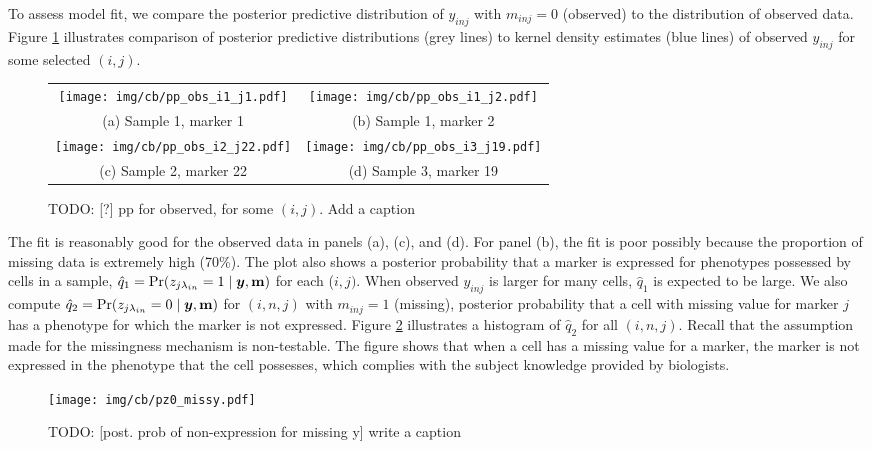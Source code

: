 \documentclass[12pt,]{article}
\def\Prob{\text{Pr}}
\newcommand{\by}{\mbox{\boldmath $y$}}
\begin{document}
To assess model fit, we compare the posterior predictive distribution of
$y_{inj}$ with $m_{inj}=0$ (observed) to the distribution of observed data.
Figure \ref{fig:cb-pp-obs-some} illustrates comparison of posterior predictive
distributions (grey lines) to kernel density estimates (blue lines) of observed
$y_{inj}$ for some selected $(i,j)$.
\begin{figure}%
\begin{center}
  \begin{tabular}{cc}
  \texttt{[image: img/cb/pp\_obs\_i1\_j1.pdf]}&
  \texttt{[image: img/cb/pp\_obs\_i1\_j2.pdf]}\\
  {\small (a) Sample 1, marker 1} & {\small (b) Sample 1, marker 2} \\
  \texttt{[image: img/cb/pp\_obs\_i2\_j22.pdf]}&
  \texttt{[image: img/cb/pp\_obs\_i3\_j19.pdf]}\\
  {\small (c) Sample 2, marker 22} & {\small (d) Sample 3, marker 19} \\
  \end{tabular}
\end{center}
\vspace{-0.05in}
\caption{TODO: [?] pp for observed, for some $(i,j)$. Add a caption}
\label{fig:cb-pp-obs-some}
\end{figure}
The fit is reasonably good for the observed data in panels (a), (c), and (d).
For panel (b), the fit is poor possibly because the proportion of missing data
is extremely high (70\%).  The plot also shows a posterior probability that a
marker is expressed for phenotypes possessed by cells in a sample,
$\hat{q}_1=\Prob(z_{j \lambda_{in}}=1 \mid \by, \bf m)$ for each ($i,j)$. When
observed $y_{inj}$ is larger for many cells, $\hat{q}_1$ is expected to be
large.  We also compute $\hat{q}_2=\Prob(z_{j \lambda_{in}}=0 \mid \by, \bf m)$
for $(i,n,j)$ with $m_{inj}=1$ (missing), posterior probability that a cell
with missing value for marker $j$ has a phenotype for which the marker is not
expressed.  Figure \ref{fig:hist-pz0-missy} illustrates a histogram of
$\hat{q}_2$ for all $(i, n, j)$.  Recall that the assumption made for the
missingness mechanism is non-testable.   The figure shows that when a cell has
a missing value for a marker, the marker is not expressed in the phenotype that
the cell possesses, which complies with the subject knowledge provided by
biologists. 

\begin{figure}
\begin{center}
  \texttt{[image: img/cb/pz0\_missy.pdf]}
  \caption{TODO: [post. prob of non-expression for missing y] write a caption}
  \label{fig:hist-pz0-missy}
\end{center}
\end{figure}
\end{document}
